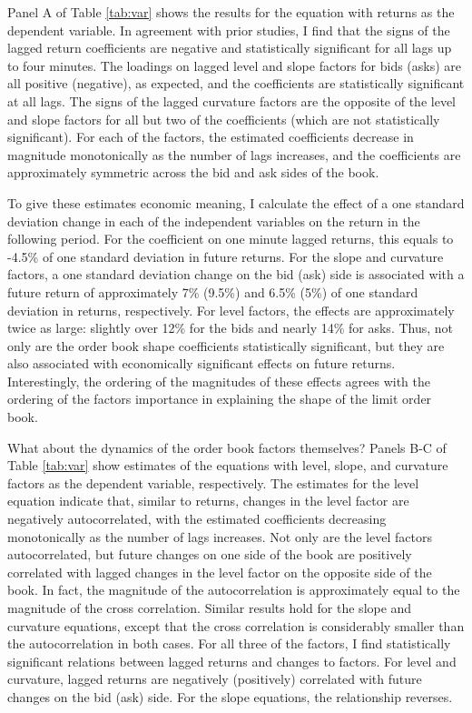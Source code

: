 Panel A of Table \ref{tab:var} shows the results for the equation with returns as the dependent variable. In agreement with prior studies, I find that the signs of the lagged return coefficients are negative and statistically significant for all lags up to four minutes. The loadings on lagged level and slope factors for bids (asks) are all positive (negative), as expected, and the coefficients are statistically significant at all lags. The signs of the lagged curvature factors are the opposite of the level and slope factors for all but two of the coefficients (which are not statistically significant). For each of the factors, the estimated coefficients decrease in magnitude monotonically as the number of lags increases, and the coefficients are approximately symmetric across the bid and ask sides of the book.




To give these estimates economic meaning, I calculate the effect of a one standard deviation change in each of the independent variables on the return in the following period. For the coefficient on one minute lagged returns, this equals to -4.5\% of one standard deviation in future returns. For the slope and curvature factors, a one standard deviation change on the bid (ask) side is associated with a future return of approximately 7\% (9.5\%) and 6.5\% (5\%) of one standard deviation in returns, respectively. For level factors, the effects are approximately twice as large: slightly over 12\% for the bids and nearly 14\% for asks. Thus, not only are the order book shape coefficients statistically significant, but they are also associated with economically significant effects on future returns. Interestingly, the ordering of the magnitudes of these effects agrees with the ordering of the factors importance in explaining the shape of the limit order book.

What about the dynamics of the order book factors themselves? Panels B-C of Table \ref{tab:var} show estimates of the equations with level, slope, and curvature factors as the dependent variable, respectively. The estimates for the level equation indicate that, similar to returns, changes in the level factor are negatively autocorrelated, with the estimated coefficients decreasing monotonically as the number of lags increases. Not only are the level factors autocorrelated, but future changes on one side of the book are positively correlated with lagged changes in the level factor on the opposite side of the book. In fact, the magnitude of the autocorrelation is approximately equal to the magnitude of the cross correlation. Similar results hold for the slope and curvature equations, except that the cross correlation is considerably smaller than the autocorrelation in both cases. For all three of the factors, I find statistically significant relations between lagged returns and changes to factors. For level and curvature, lagged returns are negatively (positively) correlated with future changes on the bid (ask) side. For the slope equations, the relationship reverses.

